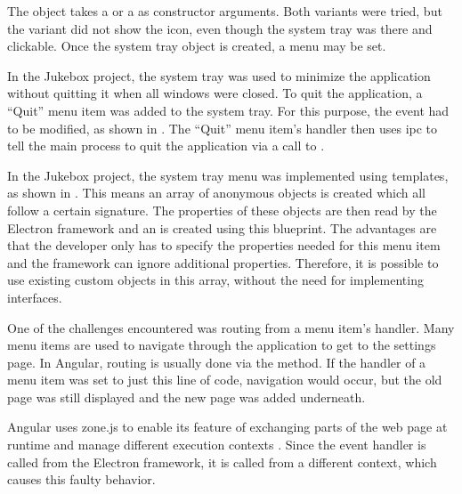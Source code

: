 The  object takes a  or a  as constructor arguments. Both variants were tried, but the  variant did not show the icon, even though the system tray was there and clickable. Once the system tray object is created, a menu may be set.


In the Jukebox project, the system tray was used to minimize the application without quitting it when all windows were closed. To quit the application, a \enquote{Quit} menu item was added to the system tray. For this purpose, the  event had to be modified, as shown in . The \enquote{Quit} menu item's  handler then uses \gls{ipc} to tell the main process to quit the application via a call to .


In the Jukebox project, the system tray menu was implemented using templates, as shown in . This means an array of anonymous objects is created which all follow a certain signature. The properties of these objects are then read by the Electron framework and an  is created using this blueprint. The advantages are that the developer only has to specify the properties needed for this menu item and the framework can ignore additional properties. Therefore, it is possible to use existing custom objects in this array, without the need for implementing interfaces.


One of the challenges encountered was routing from a menu item's  handler. Many menu items are used to navigate through the application \zB to get to the settings page. In Angular, routing is usually done via the  method. If the  handler of a menu item was set to just this line of code, navigation would occur, but the old page was still displayed and the new page was added underneath.

Angular uses zone.js to enable its  feature of exchanging parts of the web page at runtime and manage different execution contexts \cite{zoneJS}. Since the  event handler is called from the Electron framework, it is called from a different context, which causes this faulty behavior.

